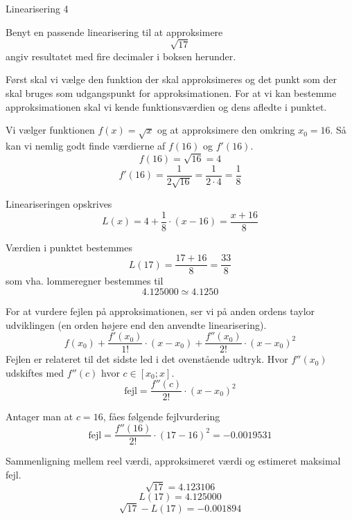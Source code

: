 \documentclass{article}
\begin{document}
\begin{exercise}{Linearisering 4}
	
	Benyt en passende linearisering til at approksimere
	\[
	\sqrt{17}
	\]
	angiv resultatet med fire decimaler i boksen herunder.
	
	\hint
	Først skal vi vælge den funktion der skal approksimeres
	og det punkt som der skal bruges som udgangspunkt for 
	approksimationen.
	For at vi kan bestemme approksimationen skal vi 
	kende funktionsværdien og dens afledte i punktet.
	
	\hint
	Vi vælger funktionen $f(x) = \sqrt{x}$ og at approksimere den 
	omkring $x_0 = 16$.
	Så kan vi nemlig godt finde værdierne af $f(16)$ og $f'(16)$.
	\[
	f(16) = \sqrt{16} = 4
	\]
	\[
	f'(16) = \frac{1}{2 \sqrt{16}} = \frac{1}{2 \cdot 4 } = \frac{1}{8}
	\]
	
	\hint
	Lineariseringen opskrives
	\[
	L(x) = 4 + \frac{1}{8} \cdot (x - 16) = \frac{x + 16}{8}
	\]
	
	\hint
	Værdien i punktet bestemmes
	\[
	L(17) = \frac{17 + 16}{8} = \frac{33}{8}
	\]
	som vha. lommeregner bestemmes til 
	\[
	4.125000 \simeq 4.1250
	\]
	
	\hint
	For at vurdere fejlen på approksimationen, ser vi på anden 
	ordens taylor udviklingen (en orden højere end den 
	anvendte linearisering).
	\[
	f(x_0) 
	+ \frac{f'(x_0)}{1!} \cdot (x - x_0) 
	+ \frac{f''(x_0)}{2!} \cdot (x - x_0)^2
	\]
	Fejlen er relateret til det sidste led i det ovenstående udtryk.
	Hvor $f''(x_0)$ udskiftes med $f''(c)$ hvor $c \in [x_0; x]$.
	\[
	\textrm{fejl} = \frac{f''(c)}{2!} \cdot (x - x_0)^2
	\]
	
	\hint 
	Antager man at $c = 16$, fåes følgende fejlvurdering
	\[
	\textrm{fejl} = \frac{f''(16)}{2!} \cdot (17 - 16)^2 = 
	-0.0019531\]
	
	\hint
	Sammenligning mellem reel værdi, approksimeret værdi og estimeret maksimal fejl.
	\[
	\sqrt{17}= 4.123106
	\]
	\[
	L(17) = 4.125000
	\]
	\[
	\sqrt{17} - L(17)  = -0.001894
	\]
	
\end{exercise}
\end{document}
